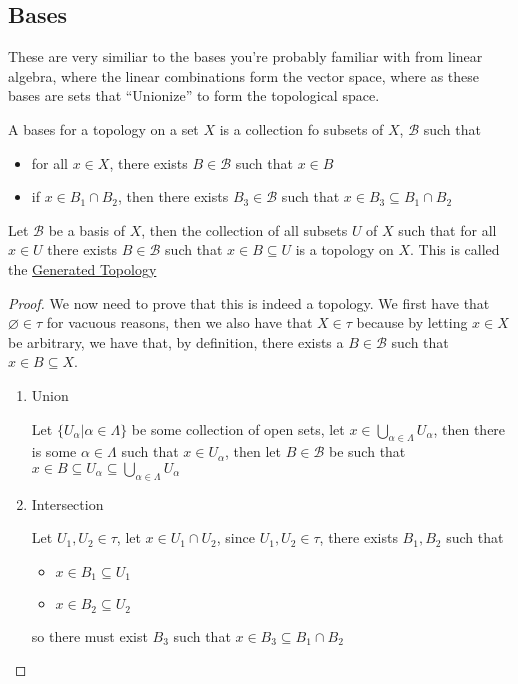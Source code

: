 \subsection{Bases}
These are very similiar to the bases you're probably familiar with from linear algebra, where the linear combinations form the vector space, where as these bases are sets that ``Unionize'' to form the topological space.
\begin{definition}[Bases]
    A bases for a topology on a set $X$ is a collection fo subsets of $X$, $\mathscr{B}$ such that
    \begin{itemize}
        \item for all $x\in X$, there exists $B\in\mathscr{B}$ such that $x\in B$
        \item if $x\in B_1\cap B_2$, then there exists $B_3\in\mathscr{B}$ such that $x\in B_3\subseteq B_1\cap B_2$
    \end{itemize}
\end{definition}
\begin{lemma}
    Let $\mathscr{B}$ be a basis of $X$, then the collection of all subsets $U$ of $X$ such that for all $x\in U$ there exists $B\in\mathscr{B}$ such that $x\in B\subseteq U$ is a topology on $X$. This is called the \href{https://proofwiki.org/wiki/Definition:Generated_Topology#:~:text=Definition%202-,The%20topology%20generated%20by%20S%2C%20denoted%20%CF%84(S)%2C,element%20of%20S%20is%20open.}{Generated Topology}    
\end{lemma}
\begin{proof}
    We now need to prove that this is indeed a topology. We first have that $\varnothing\in\tau$ for vacuous reasons, then we also have that $X\in\tau$ because by letting $x\in X$ be arbitrary, we have that, by definition, there exists a $B\in\mathscr{B}$ such that $x\in B\subseteq X$.
\begin{enumerate}
    \item Union
    
    Let $\{U_\alpha\vert\alpha\in\Lambda\}$ be some collection of open sets, let $x\in\bigcup_{\alpha\in\Lambda}U_\alpha$, then there is some $\alpha\in\Lambda$ such that $x\in U_\alpha$, then let $B\in\mathscr{B}$ be such that $x\in B\subseteq U_\alpha\subseteq \bigcup_{\alpha\in\Lambda}U_\alpha$

    \item Intersection
    
    Let $U_1,U_2\in\tau$, let $x\in U_1\cap U_2$, since $U_1,U_2\in\tau$, there exists $B_1,B_2$ such that
    \begin{itemize}
        \item $x\in B_1\subseteq U_1$
        \item $x\in B_2\subseteq U_2$
    \end{itemize}
    so there must exist $B_3$ such that $x\in B_3\subseteq B_1\cap B_2$
\end{enumerate}
\end{proof}
